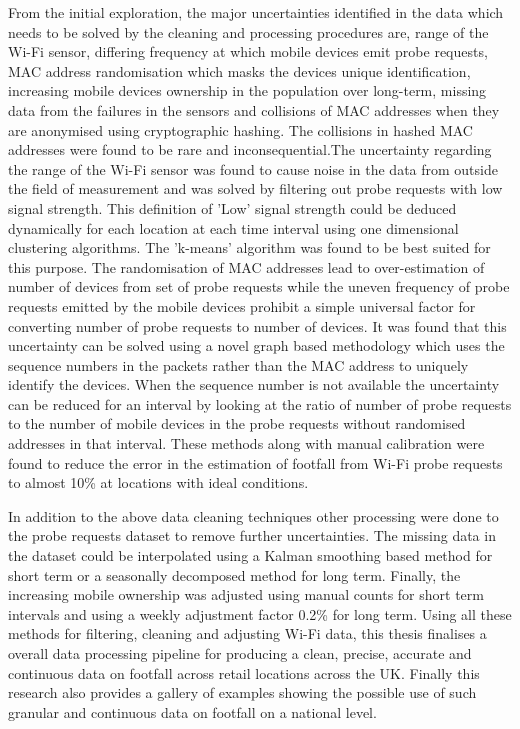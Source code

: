 From the initial exploration, the major uncertainties identified in the data which needs to be solved by the cleaning and processing procedures are, range of the Wi-Fi sensor, differing frequency at which mobile devices emit probe requests, MAC address randomisation which masks the devices unique identification, increasing mobile devices ownership in the population over long-term, missing data from the failures in the sensors and collisions of MAC addresses when they are anonymised using cryptographic hashing.
The collisions in hashed MAC addresses were found to be rare and inconsequential.The uncertainty regarding the range of the Wi-Fi sensor was found to cause noise in the data from outside the field of measurement and was solved by filtering out probe requests with low signal strength.
This definition of 'Low' signal strength could be deduced dynamically for each location at each time interval using one dimensional clustering algorithms.
The 'k-means' algorithm was found to be best suited for this purpose.
The randomisation of MAC addresses lead to over-estimation of number of devices from set of probe requests while the uneven frequency of probe requests emitted by the mobile devices prohibit a simple universal factor for converting number of probe requests to number of devices.
It was found that this uncertainty can be solved using a novel graph based methodology which uses the sequence numbers in the packets rather than the MAC address to uniquely identify the devices.
When the sequence number is not available the uncertainty can be reduced for an interval by looking at the ratio of number of probe requests to the number of mobile devices in the probe requests without randomised addresses in that interval.
These methods along with manual calibration were found to reduce the error in the estimation of footfall from Wi-Fi probe requests to almost 10\% at locations with ideal conditions.

In addition to the above data cleaning techniques other processing were done to the probe requests dataset to remove further uncertainties.
The missing data in the dataset could be interpolated using a Kalman smoothing based method for short term or a seasonally decomposed method for long term.
Finally, the increasing mobile ownership was adjusted using manual counts for short term intervals and using a weekly adjustment factor 0.2\% for long term.
Using all these methods for filtering, cleaning and adjusting Wi-Fi data, this thesis finalises a overall data processing pipeline for producing a clean, precise, accurate and continuous data on footfall across retail locations across the UK.
Finally this research also provides a gallery of examples showing the possible use of such granular and continuous data on footfall on a national level.


